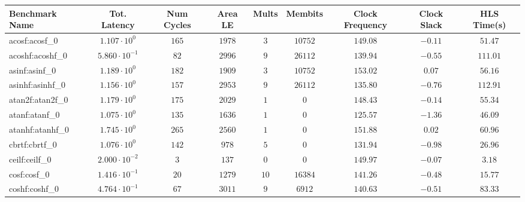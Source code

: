 \begin{tabular}{|l|c|c|c|c|c|c|c|c|}
\hline
Benchmark Name               & Tot. Latency            & Num Cycles & Area LE   & Mults   & Membits    & Clock Frequency & Clock Slack & HLS Time(s) \\
\hline
acosf:acosf\_0               & $ 1.107 \cdot 10^{0}  $ & $ 165    $ & $ 1978  $ & $ 3   $ & $ 10752  $ & $ 149.08      $ & $ -0.11   $ & $ 51.47   $ \\
acoshf:acoshf\_0             & $ 5.860 \cdot 10^{-1} $ & $ 82     $ & $ 2996  $ & $ 9   $ & $ 26112  $ & $ 139.94      $ & $ -0.55   $ & $ 111.01  $ \\
asinf:asinf\_0               & $ 1.189 \cdot 10^{0}  $ & $ 182    $ & $ 1909  $ & $ 3   $ & $ 10752  $ & $ 153.02      $ & $ 0.07    $ & $ 56.16   $ \\
asinhf:asinhf\_0             & $ 1.156 \cdot 10^{0}  $ & $ 157    $ & $ 2953  $ & $ 9   $ & $ 26112  $ & $ 135.80      $ & $ -0.76   $ & $ 112.91  $ \\
atan2f:atan2f\_0             & $ 1.179 \cdot 10^{0}  $ & $ 175    $ & $ 2029  $ & $ 1   $ & $ 0      $ & $ 148.43      $ & $ -0.14   $ & $ 55.34   $ \\
atanf:atanf\_0               & $ 1.075 \cdot 10^{0}  $ & $ 135    $ & $ 1636  $ & $ 1   $ & $ 0      $ & $ 125.57      $ & $ -1.36   $ & $ 46.09   $ \\
atanhf:atanhf\_0             & $ 1.745 \cdot 10^{0}  $ & $ 265    $ & $ 2560  $ & $ 1   $ & $ 0      $ & $ 151.88      $ & $ 0.02    $ & $ 60.96   $ \\
cbrtf:cbrtf\_0               & $ 1.076 \cdot 10^{0}  $ & $ 142    $ & $ 978   $ & $ 5   $ & $ 0      $ & $ 131.94      $ & $ -0.98   $ & $ 26.96   $ \\
ceilf:ceilf\_0               & $ 2.000 \cdot 10^{-2} $ & $ 3      $ & $ 137   $ & $ 0   $ & $ 0      $ & $ 149.97      $ & $ -0.07   $ & $ 3.18    $ \\
cosf:cosf\_0                 & $ 1.416 \cdot 10^{-1} $ & $ 20     $ & $ 1279  $ & $ 10  $ & $ 16384  $ & $ 141.26      $ & $ -0.48   $ & $ 15.77   $ \\
coshf:coshf\_0               & $ 4.764 \cdot 10^{-1} $ & $ 67     $ & $ 3011  $ & $ 9   $ & $ 6912   $ & $ 140.63      $ & $ -0.51   $ & $ 83.33   $ \\

\end{tabular}
